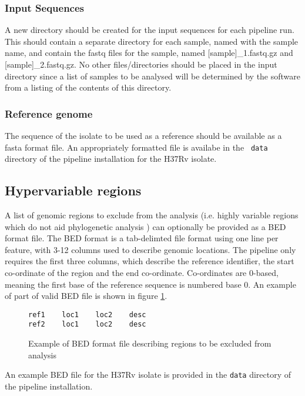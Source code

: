 \documentclass[a4paper,10pt,twoside]{article}
\begin{document}
\subsubsection {Input Sequences}

A new directory should be created for the input sequences for each pipeline
run. This should contain a separate directory for each sample, named with the
sample name, and contain the fastq files for the sample, named
[sample]\_1.fastq.gz and [sample]\_2.fastq.gz. No other files/directories
should be placed in the input directory since a list of samples to be analysed
will be determined by the software from a listing of the contents of this
directory.

\subsubsection {Reference genome}

The sequence of the isolate to be used as a reference should be available as a
fasta format file. An appropriately formatted file is availabe in the {\tt
data} directory of the pipeline installation for the H37Rv isolate. 

\subsection {Hypervariable regions}

A list of genomic regions to exclude from the analysis (i.e. highly variable
regions which do not aid phylogenetic analysis ) can optionally be provided as
a BED format file. The BED format is a tab-delimted file format using one line
per feature, with 3-12 columns used to describe genomic locations. The pipeline
only requires the first three columns, which describe the reference identifier,
the start co-ordinate of the region and the end co-ordinate. Co-ordinates are
0-based, meaning the first base of the reference sequence is numbered base 0.
An example of part of valid BED file is shown in figure \ref{fig:1}.

\begin{figure}
	\hrulefill
	\begin{verbatim}
ref1	loc1	loc2	desc
ref2	loc1	loc2	desc
	\end{verbatim}
	\hrulefill
	\caption{Example of BED format file describing regions to be excluded from analysis}\label{fig:1}
\end{figure}

An example BED file for the H37Rv isolate is provided in the {\tt data}
directory of the pipeline installation.
\end{document}
